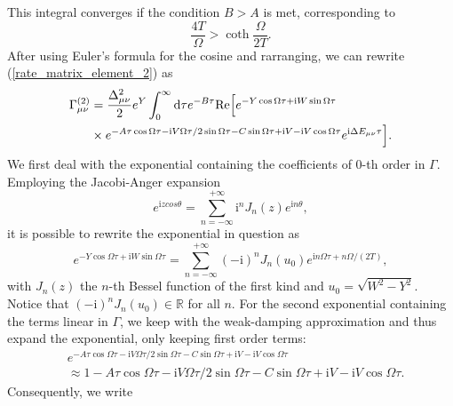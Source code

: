 \documentclass[11pt]{article}
\begin{document}
%
This integral converges if the condition $B>A$ is met, corresponding to
%
\begin{equation}
    \frac{4T}{\Omega}>\coth\frac{\Omega}{2T}.
\end{equation}
%
After using Euler's formula for the cosine and rarranging, we can rewrite 
(\ref{rate_matrix_element_2}) as
%
\begin{equation}\label{rate_matrix_element_2}
\begin{split}
    \Gamma_{\mu\nu}^{(2)} &=\frac{\Delta_{\mu\nu}^2}{2}e^Y\int_{0}^{\infty}
    \text{d}\tau e^{-B\tau}\text{Re}\Bigl[ e^{-Y\cos\Omega\tau+\text{i}W\sin\Omega\tau} \\
    &\times e^{-A\tau\cos\Omega\tau-\text{i}V\Omega\tau/2\sin\Omega\tau 
    -C\sin\Omega\tau+\text{i}V-\text{i}V\cos\Omega\tau}e^{\text{i}\Delta E_{\mu\nu}\tau}\Bigr].
\end{split}
\end{equation}
%
We first deal with the exponential containing the coefficients of $0$-th 
order in $\Gamma$. Employing the Jacobi-Anger expansion 
%
\begin{equation}
    e^{\text{i}zcos\theta} = \sum_{n=-\infty}^{+\infty}\text{i}^n J_n(z)e^{\text{i}n\theta},
\end{equation}
%
it is possible to rewrite the exponential in question as 
%
\begin{equation}
    e^{-Y\cos\Omega\tau+\text{i}W\sin\Omega\tau} = 
    \sum_{n=-\infty}^{+\infty}(-\text{i})^n J_n(u_0) e^{\text{i}n\Omega\tau +n\Omega/(2T)},
\end{equation}
%
with $J_n(z)$ the $n$-th Bessel function of the first kind and 
$u_0 = \sqrt{W^2 - Y^2}$. Notice that $(-\text{i})^n J_n(u_0) \in \mathbb{R}$ 
for all $n$.
For the second exponential containing the terms
linear in $\Gamma$, we keep with the weak-damping approximation and thus 
expand the exponential, only keeping first order terms:
%
\begin{equation}
\begin{split}
    &e^{-A\tau\cos\Omega\tau-\text{i}V\Omega\tau/2\sin\Omega\tau 
    -C\sin\Omega\tau+\text{i}V-\text{i}V\cos\Omega\tau} \\
    &\approx 1 -A\tau\cos\Omega\tau-\text{i}V\Omega\tau/2\sin\Omega\tau 
    -C\sin\Omega\tau+\text{i}V-\text{i}V\cos\Omega\tau.
\end{split}
\end{equation}
%
Consequently, we write
%
\end{document}
